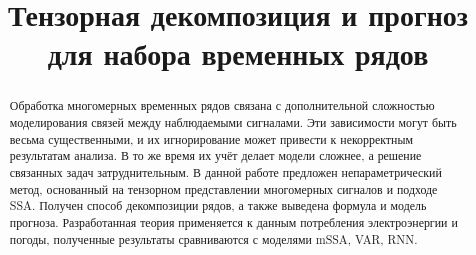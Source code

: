 
\usepackage[backend=biber, style=gost-numeric, sorting=none]{biblatex}
\usepackage{subfigure}



\theoremstyle{definition}
\newtheorem*{Def}{Определение}
\theoremstyle{plain}
\newtheorem{Lem}{Лемма}
\newtheorem{Th}{Теорема}

\newcommand{\delayV}[1]{\overset{\leftarrow}{\mathbf{x}}_{#1}}
\newcommand{\delayM}[1]{\overset{\leftarrow}{\mathbf{X}}_{#1}}

\linespread{1.5}
\setlength{\parindent}{1.25cm}

\setcounter{page}{2}

\title{Тензорная декомпозиция и прогноз для набора временных рядов}

\date{}


	
	\hspace{0pt}
	\vfill
	\begin{center}
		\tableofcontents
	\end{center}
	\vfill
	\hspace{0pt}
	
	\newpage
	
	\hspace{0pt}
	\vfill
	
	\begin{abstract}
		
		Обработка многомерных временных рядов связана с дополнительной сложностью моделирования связей между наблюдаемыми сигналами. Эти зависимости могут быть весьма существенными, и их игнорирование может привести к некорректным результатам анализа. В то же время их учёт делает модели сложнее, а решение связанных задач затруднительным. В данной работе предложен непараметрический метод, основанный на тензорном представлении многомерных сигналов и подходе SSA. Получен способ декомпозиции рядов, а также выведена формула и модель прогноза. Разработанная теория применяется к данным потребления электроэнергии и погоды, полученные результаты сравниваются с моделями mSSA, VAR, RNN.
		
	\end{abstract}
	
